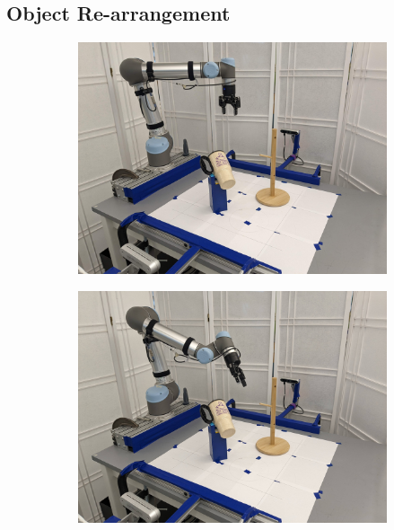 \documentclass{article}
\begin{document}
\subsection{Object Re-arrangement}
\label{sec:exp:rearrangement}

\begin{figure}[]
    \centering

    \begin{subfigure}{(\linewidth - 0.05\linewidth)/5}
        \centering
        \includegraphics[width=\linewidth]{figures/episodes/mug_on_tree/1.jpg}
    \end{subfigure}
    \begin{subfigure}{(\linewidth - 0.05\linewidth)/5}
        \centering
        \includegraphics[width=\linewidth]{figures/episodes/mug_on_tree/2.jpg}

\end{subfigure}
\end{figure}
\end{document}

